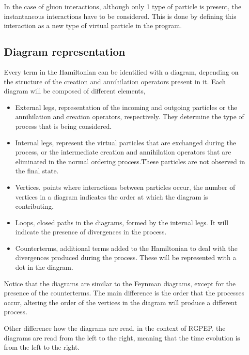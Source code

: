 \documentclass[11pt,a4paper,twoside,pdf]{article}
\numberwithin{equation}{section}
\begin{document}
In the case of gluon interactions, although only 1 type of particle is present, the
instantaneous interactions have to be considered. This is done by defining this 
interaction as a new type of virtual particle in the program.


\subsection{Diagram representation}

Every term in the Hamiltonian can be identified with a diagram, depending on the 
structure of the creation and annihilation operators present in it. Each diagram 
will be composed of different elements, 

\begin{itemize}
    \item External legs, representation of the incoming and outgoing particles or 
    the annihilation and creation operators, respectively. They determine the type 
    of process that is being considered.
    \item Internal legs, represent the virtual particles that are exchanged during the
    process, or the intermediate creation and annihilation operators that are 
    eliminated in the normal ordering process.These particles are not observed in 
    the final state.
    \item Vertices, points where interactions between particles occur, the number of
    vertices in a diagram indicates the order at which the diagram is contributing.
    \item Loops, closed paths in the diagrams, formed by the internal legs. It will
    indicate the presence of divergences in the process.
    \item Counterterms, additional terms added to the Hamiltonian to deal with the divergences
    produced during the process. These will be represented with a dot in the diagram.
\end{itemize}

Notice that the diagrams are similar to the Feynman diagrams\cite{Peskin:1995ev}, except for the presence
of the counterterms. The main difference is the order that the processes occur, altering
the order of the vertices in the diagram will produce a different process. 

Other difference how the diagrams are read, in the context of RGPEP, the diagrams are
read from the left to the right, meaning that the time evolution is from the left to 
the right.
\end{document}
